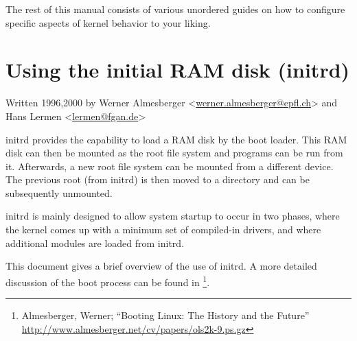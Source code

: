 \documentclass[a4paper,8pt,english]{sphinxmanual}
\begin{document}
The rest of this manual consists of various unordered guides on how to
configure specific aspects of kernel behavior to your liking.


\chapter{Using the initial RAM disk (initrd)}
\label{admin-guide/initrd:using-the-initial-ram-disk-initrd}\label{admin-guide/initrd::doc}
Written 1996,2000 by Werner Almesberger \textless{}\href{mailto:werner.almesberger@epfl.ch}{werner.almesberger@epfl.ch}\textgreater{} and
Hans Lermen \textless{}\href{mailto:lermen@fgan.de}{lermen@fgan.de}\textgreater{}

initrd provides the capability to load a RAM disk by the boot loader.
This RAM disk can then be mounted as the root file system and programs
can be run from it. Afterwards, a new root file system can be mounted
from a different device. The previous root (from initrd) is then moved
to a directory and can be subsequently unmounted.

initrd is mainly designed to allow system startup to occur in two phases,
where the kernel comes up with a minimum set of compiled-in drivers, and
where additional modules are loaded from initrd.

This document gives a brief overview of the use of initrd. A more detailed
discussion of the boot process can be found in \footnote[1]{
Almesberger, Werner; ``Booting Linux: The History and the Future''
\href{http://www.almesberger.net/cv/papers/ols2k-9.ps.gz}{http://www.almesberger.net/cv/papers/ols2k-9.ps.gz}
}.
\end{document}
